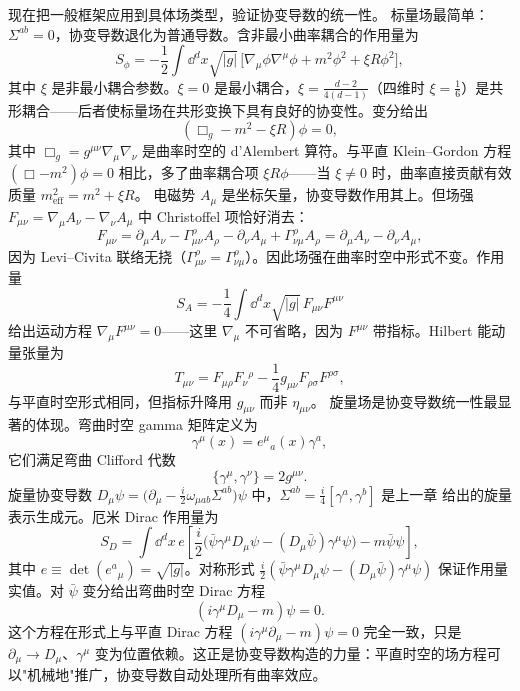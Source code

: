 现在把一般框架应用到具体场类型，验证协变导数的统一性。
标量场最简单：$\Sigma^{ab}=0$，协变导数退化为普通导数。含非最小曲率耦合的作用量为
\begin{equation}
S_\phi=-\frac{1}{2}\int \dd^dx\sqrt{|g|}\,\big[\nabla_\mu\phi\nabla^\mu\phi+m^2\phi^2+\xi R\phi^2\big],
\end{equation}
其中 $\xi$ 是非最小耦合参数。$\xi=0$ 是最小耦合，$\xi=\frac{d-2}{4(d-1)}$（四维时 $\xi=\frac{1}{6}$）是共形耦合——后者使标量场在共形变换下具有良好的协变性。变分给出
\begin{equation*}\boxed{(\Box_g-m^2-\xi R)\phi=0,}
\end{equation*}
其中 $\Box_g=g^{\mu\nu}\nabla_\mu\nabla_\nu$ 是曲率时空的 d'Alembert 算符。与平直 Klein--Gordon 方程 $(\Box-m^2)\phi=0$ 相比，多了曲率耦合项 $\xi R\phi$——当 $\xi\neq0$ 时，曲率直接贡献有效质量 $m_{\text{eff}}^2=m^2+\xi R$。
电磁势 $A_\mu$ 是坐标矢量，协变导数作用其上。但场强 $F_{\mu\nu}=\nabla_\mu A_\nu-\nabla_\nu A_\mu$ 中 Christoffel 项恰好消去：
\begin{equation*}
F_{\mu\nu}=\partial_\mu A_\nu-\Gamma^\rho_{\mu\nu}A_\rho-\partial_\nu A_\mu+\Gamma^\rho_{\nu\mu}A_\rho=\partial_\mu A_\nu-\partial_\nu A_\mu,
\end{equation*}
因为 Levi--Civita 联络无挠（$\Gamma^\rho_{\mu\nu}=\Gamma^\rho_{\nu\mu}$）。因此场强在曲率时空中形式不变。作用量
\begin{equation}
S_A=-\frac{1}{4}\int \dd^dx\sqrt{|g|}\,F_{\mu\nu}F^{\mu\nu}
\end{equation}
给出运动方程 $\nabla_\mu F^{\mu\nu}=0$——这里 $\nabla_\mu$ 不可省略，因为 $F^{\mu\nu}$ 带指标。Hilbert 能动量张量为
\begin{equation}
T_{\mu\nu}=F_{\mu\rho}F_\nu{}^\rho-\frac{1}{4}g_{\mu\nu}F_{\rho\sigma}F^{\rho\sigma},
\end{equation}
与平直时空形式相同，但指标升降用 $g_{\mu\nu}$ 而非 $\eta_{\mu\nu}$。
旋量场是协变导数统一性最显著的体现。弯曲时空 gamma 矩阵定义为
\begin{equation}
\gamma^\mu(x)=e^\mu{}_a(x)\gamma^a,
\end{equation}
它们满足弯曲 Clifford 代数
\begin{equation}
\{\gamma^\mu,\gamma^\nu\}=2g^{\mu\nu}.
\end{equation}
旋量协变导数 $D_\mu\psi=\big(\partial_\mu-\frac{i}{2}\omega_{\mu ab}\Sigma^{ab}\big)\psi$ 中，$\Sigma^{ab}=\frac{i}{4}[\gamma^a,\gamma^b]$ 是上一章 给出的旋量表示生成元。厄米 Dirac 作用量为
\begin{equation*}\boxed{
S_D=\int \dd^dx\,e\left[\frac{i}{2}\big(\bar\psi\gamma^\mu D_\mu\psi-(D_\mu\bar\psi)\gamma^\mu\psi\big)-m\bar\psi\psi\right],
}
\end{equation*}
其中 $e\equiv\det(e^a{}_\mu)=\sqrt{|g|}$。对称形式 $\frac{i}{2}(\bar\psi\gamma^\mu D_\mu\psi-(D_\mu\bar\psi)\gamma^\mu\psi)$ 保证作用量实值。对 $\bar\psi$ 变分给出弯曲时空 Dirac 方程
\begin{equation}
(i\gamma^\mu D_\mu-m)\psi=0.
\end{equation}
这个方程在形式上与平直 Dirac 方程 $(i\gamma^\mu\partial_\mu-m)\psi=0$ 完全一致，只是 $\partial_\mu\to D_\mu$、$\gamma^\mu$ 变为位置依赖。这正是协变导数构造的力量：平直时空的场方程可以"机械地"推广，协变导数自动处理所有曲率效应。

